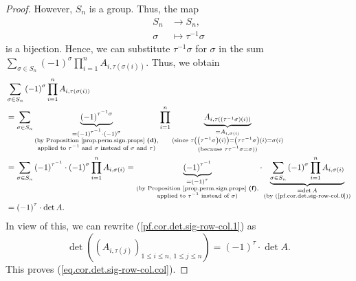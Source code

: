 \begin{proof}
However, $S_{n}$ is a group. Thus, the map%
\begin{align*}
S_{n}  &  \rightarrow S_{n},\\
\sigma &  \mapsto\tau^{-1}\sigma
\end{align*}
is a bijection. Hence, we can substitute $\tau^{-1}\sigma$ for $\sigma$ in the
sum $\sum_{\sigma\in S_{n}}\left(  -1\right)  ^{\sigma}\prod_{i=1}%
^{n}A_{i,\tau\left(  \sigma\left(  i\right)  \right)  }$. Thus, we obtain%
\begin{align*}
&  \sum_{\sigma\in S_{n}}\left(  -1\right)  ^{\sigma}\prod_{i=1}^{n}%
A_{i,\tau\left(  \sigma\left(  i\right)  \right)  }\\
&  =\sum_{\sigma\in S_{n}}\underbrace{\left(  -1\right)  ^{\tau^{-1}\sigma}%
}_{\substack{=\left(  -1\right)  ^{\tau^{-1}}\cdot\left(  -1\right)  ^{\sigma
}\\\text{(by Proposition \ref{prop.perm.sign.props} \textbf{(d)}%
,}\\\text{applied to }\tau^{-1}\text{ and }\sigma\text{ instead of }%
\sigma\text{ and }\tau\text{)}}}\prod_{i=1}^{n}\underbrace{A_{i,\tau\left(
\left(  \tau^{-1}\sigma\right)  \left(  i\right)  \right)  }}%
_{\substack{=A_{i,\sigma\left(  i\right)  }\\\text{(since }\tau\left(  \left(
\tau^{-1}\sigma\right)  \left(  i\right)  \right)  =\left(  \tau\tau
^{-1}\sigma\right)  \left(  i\right)  =\sigma\left(  i\right)
\\\text{(because }\tau\tau^{-1}\sigma=\sigma\text{))}}}\\
&  =\sum_{\sigma\in S_{n}}\left(  -1\right)  ^{\tau^{-1}}\cdot\left(
-1\right)  ^{\sigma}\prod_{i=1}^{n}A_{i,\sigma\left(  i\right)  }%
=\underbrace{\left(  -1\right)  ^{\tau^{-1}}}_{\substack{=\left(  -1\right)
^{\tau}\\\text{(by Proposition \ref{prop.perm.sign.props} \textbf{(f)}%
,}\\\text{applied to }\tau^{-1}\text{ instead of }\sigma\text{)}}%
}\cdot\underbrace{\sum_{\sigma\in S_{n}}\left(  -1\right)  ^{\sigma}%
\prod_{i=1}^{n}A_{i,\sigma\left(  i\right)  }}_{\substack{=\det A\\\text{(by
(\ref{pf.cor.det.sig-row-col.0}))}}}\\
&  =\left(  -1\right)  ^{\tau}\cdot\det A.
\end{align*}
In view of this, we can rewrite (\ref{pf.cor.det.sig-row-col.1}) as%
\[
\det\left(  \left(  A_{i,\tau\left(  j\right)  }\right)  _{1\leq i\leq
n,\ 1\leq j\leq n}\right)  =\left(  -1\right)  ^{\tau}\cdot\det A.
\]
This proves (\ref{eq.cor.det.sig-row-col.col}).


\end{proof}

